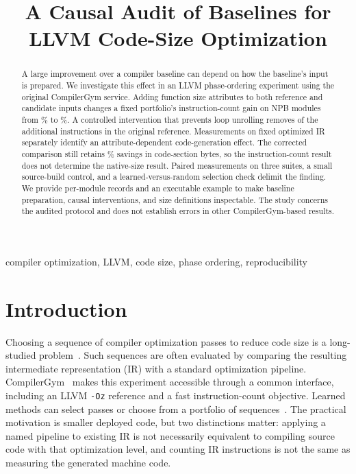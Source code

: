 \documentclass[conference,a4paper]{IEEEtran}
\begin{document}
\title{A Causal Audit of Baselines for\\LLVM Code-Size Optimization}
\author{
}
\maketitle

\begin{abstract}
A large improvement over a compiler baseline can depend on how the
baseline's input is prepared. We investigate this effect in an LLVM
phase-ordering experiment using the original CompilerGym service.
Adding function size attributes to both reference and candidate inputs
changes a fixed portfolio's instruction-count gain on \NpbCount{} NPB
modules from \NpbPlainIcGain\% to \NpbAttrIcGain\%.
A controlled intervention that prevents loop unrolling removes
\UnrollIcDelta{} of the \AttrIcDelta{} additional instructions in the
original reference. Measurements on fixed optimized IR separately
identify an attribute-dependent code-generation effect. The corrected
comparison still retains \NpbAttrCodeGain\% savings in code-section
bytes, so the instruction-count result does not determine the
native-size result. Paired measurements on three suites, a small source-build
control, and a learned-versus-random selection check delimit the finding.
We provide per-module records and an executable example to make baseline
preparation, causal interventions, and size definitions inspectable.
The study concerns the audited protocol and does not establish errors
in other CompilerGym-based results.
\end{abstract}

\begin{IEEEkeywords}
compiler optimization, LLVM, code size, phase ordering, reproducibility
\end{IEEEkeywords}

\section{Introduction}
Choosing a sequence of compiler optimization passes to reduce code size
is a long-studied problem~\cite{cooper1999}. Such sequences are often
evaluated by comparing the resulting intermediate representation (IR)
with a standard optimization pipeline. CompilerGym~\cite{compilergym} makes
this experiment accessible through a common interface, including an
LLVM \texttt{-Oz} reference and a fast instruction-count objective.
Learned methods can select passes or choose from a portfolio of
sequences~\cite{coreset}. The practical motivation is smaller deployed
code, but two distinctions matter: applying a named pipeline to existing
IR is not necessarily equivalent to compiling source code with that
optimization level, and counting IR instructions is not the same as
measuring the generated machine code.
\end{document}
